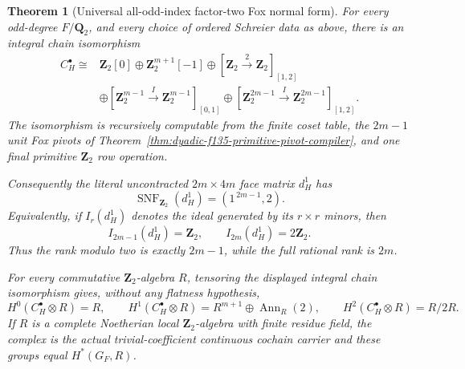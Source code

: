 \documentclass[11pt]{article}
\newtheorem{theorem}{Theorem}[section]
\theoremstyle{definition}
\begin{document}
\begin{theorem}[Universal all-odd-index factor-two Fox normal form]
\label{thm:dyadic-f138-all-odd-index-factor-two}
For every odd-degree $F/\mathbf Q_2$, and every
choice of ordered Schreier data as above, there is an
integral chain isomorphism
\begin{equation}\label{eq:dyadic-f138-general-strict-normal-form}
\boxed{
\begin{aligned}
C_H^\bullet\cong {}&
\mathbf Z_2[0]\oplus
\mathbf Z_2^{m+1}[-1]\oplus
[\mathbf Z_2\xrightarrow{\ 2\ }\mathbf Z_2]_{[1,2]}
\\
&\oplus
[\mathbf Z_2^{m-1}\xrightarrow{I}
 \mathbf Z_2^{m-1}]_{[0,1]}
\oplus
[\mathbf Z_2^{2m-1}\xrightarrow{I}
 \mathbf Z_2^{2m-1}]_{[1,2]} .
\end{aligned}}
\end{equation}
The isomorphism is recursively computable from the
finite coset table, the $2m-1$ unit Fox pivots of
Theorem~\ref{thm:dyadic-f135-primitive-pivot-compiler},
and one final primitive $\mathbf Z_2$ row operation.

Consequently the \emph{literal uncontracted}
$2m\times4m$ face matrix $d_H^1$ has
\begin{equation}\label{eq:dyadic-f138-general-smith-law}
\boxed{\qquad
\operatorname{SNF}_{\mathbf Z_2}(d_H^1)
=(1^{\,2m-1},2).
\qquad}
\end{equation}
Equivalently, if $I_r(d_H^1)$ denotes the ideal
generated by its $r\times r$ minors, then
\begin{equation}\label{eq:dyadic-f138-general-determinantal-ideals}
\boxed{\qquad
I_{2m-1}(d_H^1)=\mathbf Z_2,\qquad
I_{2m}(d_H^1)=2\mathbf Z_2.
\qquad}
\end{equation}
Thus the rank modulo two is exactly $2m-1$, while
the full rational rank is $2m$.

For every commutative $\mathbf Z_2$-algebra $R$,
tensoring the displayed integral chain isomorphism
gives, without any flatness hypothesis,
\begin{equation}\label{eq:dyadic-f138-general-R-normal-form}
\boxed{
H^0(C_H^\bullet\otimes R)=R,\qquad
H^1(C_H^\bullet\otimes R)
=R^{m+1}\oplus\operatorname{Ann}_{R}(2),\qquad
H^2(C_H^\bullet\otimes R)=R/2R .
}
\end{equation}
If $R$ is a complete Noetherian local
$\mathbf Z_2$-algebra with finite residue field,
the complex is the actual trivial-coefficient
continuous cochain carrier and these groups equal
$H^*(G_F,R)$.
\end{theorem}
\end{document}
